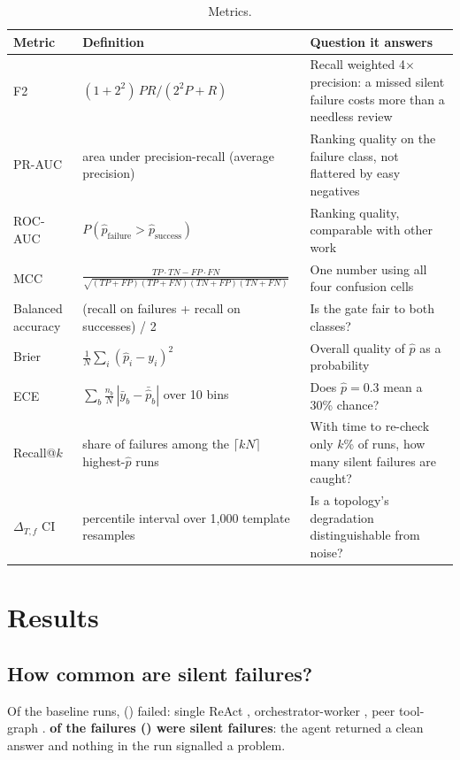 \documentclass[10pt,twocolumn]{article}
\newcommand{\SFs}{\textcolor{sfred}{\textbf{silent failures}}}
\begin{document}
\begin{table}[t]
\caption{Metrics.}\label{tab:metrics}
\footnotesize
\begin{tabularx}{\textwidth}{@{}P{30mm}P{70mm}L@{}}
\toprule
Metric & Definition & Question it answers\\
\midrule
F2 \cite{rijsbergen} & $(1+2^2)\,PR / (2^2 P + R)$ & Recall weighted 4$\times$ precision: a missed silent
  failure costs more than a needless review\\
PR-AUC \cite{saito} & area under precision-recall (average precision) & Ranking quality on the failure class, not
  flattered by easy negatives\\
ROC-AUC & $P(\hat{p}_{\text{failure}} > \hat{p}_{\text{success}})$ & Ranking quality, comparable with other work\\
MCC \cite{chicco} & $\frac{TP\cdot TN - FP\cdot FN}{\sqrt{(TP+FP)(TP+FN)(TN+FP)(TN+FN)}}$ & One number using all
  four confusion cells\\
Balanced accuracy & (recall on failures + recall on successes) / 2 & Is the gate fair to both classes?\\
Brier \cite{brier} & $\frac{1}{N}\sum_i (\hat{p}_i - y_i)^2$ & Overall quality of $\hat{p}$ as a probability\\
ECE \cite{guo} & $\sum_b \frac{n_b}{N}\,|\bar{y}_b - \bar{\hat{p}}_b|$ over 10 bins & Does $\hat{p} = 0.3$ mean a 30\%
  chance?\\
Recall@$k$ & share of failures among the $\lceil kN \rceil$ highest-$\hat{p}$ runs & With time to re-check only
  $k$\% of runs, how many silent failures are caught?\\
$\Delta_{T,f}$ CI \cite{efron,cameron} & percentile interval over 1,000 template resamples & Is a topology's
  degradation distinguishable from noise?\\
\bottomrule
\end{tabularx}
\end{table}

\section{Results}
\subsection{How common are silent failures?}
Of the \nRuns{} baseline runs, \nFail{} (\failRate) failed: single ReAct \failSingle, orchestrator-worker
\failOrch, peer tool-graph \failPeer. \textbf{\nSilent{} of the \nFail{} failures (\silentShare) were \SFs}: the
agent returned a clean answer and nothing in the run signalled a problem. \FFailureRates
\end{document}
